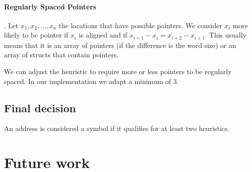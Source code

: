 \documentclass[]{llncs}
\begin{document}
\paragraph{Regularly Spaced Pointers}.
Let $x_1,x_2,\ldots,x_n$ the locations that have possible pointers.
We consider $x_i$ more likely to be pointer if $x_i$ is aligned
and if $x_{i+1}-x_i=x_{i+2}-x_{i+1}$. This usually means that it is an array of pointers
(if the difference is the word size) or an array of structs that contain pointers.

We can adjust the heuristic to require more or less pointers to be regularly spaced.
In our implementation we adapt a minimum of 3.



\subsection{Final decision}
An address is considered a symbol if it qualifies for at least two heuristics.


\section{Future work}
\end{document}
